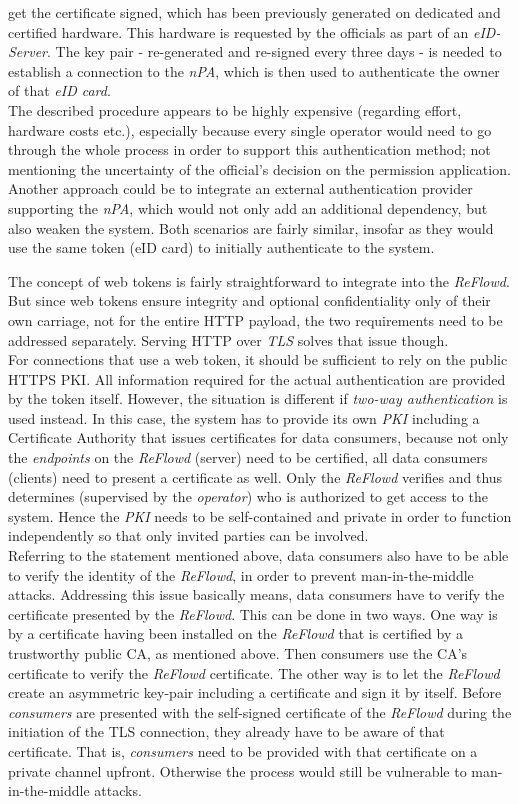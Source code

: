 \documentclass[12pt,english,a4paper,titlepage,cleardoublepage=empty,dottedtoc]{report}
\begin{document}
get the certificate signed, which has been previously generated on
dedicated and certified hardware. This hardware is requested by the
officials as part of an \emph{eID-Server}. The key pair - re-generated
and re-signed every three days - is needed to establish a connection to
the \emph{nPA}, which is then used to authenticate the owner of that
\emph{eID card}.\\
The described procedure appears to be highly expensive (regarding
effort, hardware costs etc.), especially because every single operator
would need to go through the whole process in order to support this
authentication method; not mentioning the uncertainty of the official's
decision on the permission application. Another approach could be to
integrate an external authentication provider supporting the \emph{nPA},
which would not only add an additional dependency, but also weaken the
system. Both scenarios are fairly similar, insofar as they would use the
same token (eID card) to initially authenticate to the system.

The concept of web tokens is fairly straightforward to integrate into
the \emph{ReFlowd}. But since web tokens ensure integrity and optional
confidentiality only of their own carriage, not for the entire HTTP
payload, the two requirements need to be addressed separately. Serving
HTTP over \emph{TLS} solves that issue though.\\
For connections that use a web token, it should be sufficient to rely on
the public HTTPS PKI. All information required for the actual
authentication are provided by the token itself. However, the situation
is different if \emph{two-way authentication} is used instead. In this
case, the system has to provide its own \emph{PKI} including a
Certificate Authority that issues certificates for data consumers,
because not only the \emph{endpoints} on the \emph{ReFlowd} (server)
need to be certified, all data consumers (clients) need to present a
certificate as well. Only the \emph{ReFlowd} verifies and thus
determines (supervised by the \emph{operator}) who is authorized to get
access to the system. Hence the \emph{PKI} needs to be self-contained
and private in order to function independently so that only invited
parties can be involved.\\
Referring to the statement mentioned above, data consumers also have to
be able to verify the identity of the \emph{ReFlowd}, in order to
prevent man-in-the-middle attacks. Addressing this issue basically
means, data consumers have to verify the certificate presented by the
\emph{ReFlowd}. This can be done in two ways. One way is by a
certificate having been installed on the \emph{ReFlowd} that is
certified by a trustworthy public CA, as mentioned above. Then consumers
use the CA's certificate to verify the \emph{ReFlowd} certificate. The
other way is to let the \emph{ReFlowd} create an asymmetric key-pair
including a certificate and sign it by itself. Before \emph{consumers}
are presented with the self-signed certificate of the \emph{ReFlowd}
during the initiation of the TLS connection, they already have to be
aware of that certificate. That is, \emph{consumers} need to be provided
with that certificate on a private channel upfront. Otherwise the
process would still be vulnerable to man-in-the-middle attacks.
\end{document}
